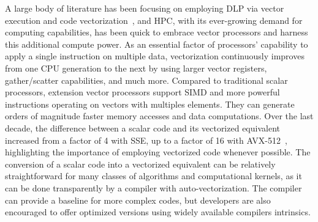 \documentclass[5p,times,twocolumn]{elsarticle}
\begin{document}
A large body of literature has been focusing on employing DLP via vector
execution and code vectorization~\cite{VectorizingCompilers1,vectorizingcompilers,SIMDVectorOperations}, and HPC, with its ever-growing demand for computing capabilities, has been quick to embrace vector processors and harness this additional compute power.
As an essential factor of processors' capability to apply
a single instruction on multiple data, vectorization continuously improves
from one CPU generation to the next by using larger vector registers, gather/scatter capabilities, and much more.
Compared to traditional scalar processors, extension vector processors support
SIMD and more powerful instructions operating
on vectors with multiples elements. They can generate orders of magnitude faster memory accesses and data computations.
Over the last decade, the difference between a scalar code and its vectorized equivalent
increased from a factor of 4 with SSE, up to a factor of 16 with AVX-512~\cite{PentiumIII,Haswelldetail,avx-info}, highlighting the importance of employing vectorized code whenever possible.
The conversion of a scalar code into a vectorized
equivalent can be relatively straightforward for many classes of algorithms
and computational kernels, as it can be done transparently by a compiler
with auto-vectorization. The compiler can provide a baseline for more complex codes,
but developers are also encouraged to offer optimized versions using
widely available compilers intrinsics.
%
\end{document}
